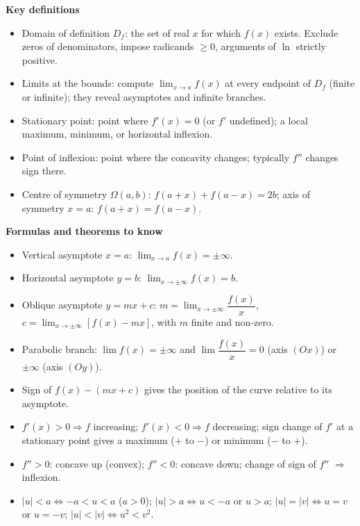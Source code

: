 \documentclass[11pt]{article}
\newcommand{\cle}[1]{{\popxbold\color{popdark}#1}}
\begin{document}
\begin{bilan}
\textbf{Key definitions}
\begin{itemize}
\item \cle{Domain of definition} $D_f$: the set of real $x$ for which $f(x)$ exists. Exclude zeros of denominators, impose radicands $\ge 0$, arguments of $\ln$ strictly positive.
\item \cle{Limits at the bounds}: compute $\lim_{x\to a}f(x)$ at every endpoint of $D_f$ (finite or infinite); they reveal asymptotes and infinite branches.
\item \cle{Stationary point}: point where $f'(x)=0$ (or $f'$ undefined); a local maximum, minimum, or horizontal inflexion.
\item \cle{Point of inflexion}: point where the concavity changes; typically $f''$ changes sign there.
\item \cle{Centre of symmetry} $\Omega(a,b)$: $f(a+x)+f(a-x)=2b$; \cle{axis of symmetry} $x=a$: $f(a+x)=f(a-x)$.
\end{itemize}

\textbf{Formulas and theorems to know}
\begin{itemize}
\item Vertical asymptote $x=a$: $\lim_{x\to a}f(x)=\pm\infty$.
\item Horizontal asymptote $y=b$: $\lim_{x\to\pm\infty}f(x)=b$.
\item Oblique asymptote $y=mx+c$: $m=\lim_{x\to\pm\infty}\dfrac{f(x)}{x}$, $c=\lim_{x\to\pm\infty}[f(x)-mx]$, with $m$ finite and non-zero.
\item Parabolic branch: $\lim f(x)=\pm\infty$ and $\lim \dfrac{f(x)}{x}=0$ (axis $(Ox)$) or $\pm\infty$ (axis $(Oy)$).
\item Sign of $f(x)-(mx+c)$ gives the \cle{position of the curve} relative to its asymptote.
\item $f'(x)>0 \Rightarrow f$ increasing; $f'(x)<0 \Rightarrow f$ decreasing; sign change of $f'$ at a stationary point gives a maximum ($+$ to $-$) or minimum ($-$ to $+$).
\item $f''>0$: concave up (convex); $f''<0$: concave down; change of sign of $f''$ $\Rightarrow$ inflexion.
\item $|u|<a \iff -a<u<a$ ($a>0$); $|u|>a \iff u<-a$ or $u>a$; $|u|=|v| \iff u=v$ or $u=-v$; $|u|<|v| \iff u^2<v^2$.
\end{itemize}


\end{bilan}
\end{document}
